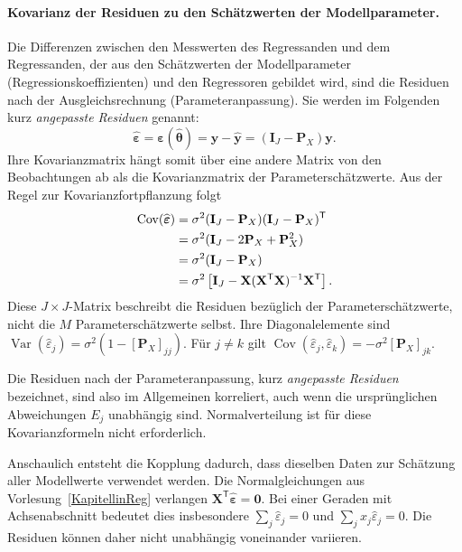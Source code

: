 \paragraph{Kovarianz der Residuen zu den Schätzwerten der Modellparameter.}
Die Differenzen zwischen den Messwerten des Regressanden und dem Regressanden, der aus den Schätzwerten der Modellparameter (Regressionskoeffizienten) und den Regressoren gebildet wird, sind die Residuen nach der Ausgleichsrechnung (Parameteranpassung). Sie werden im Folgenden kurz \textsl{angepasste Residuen} genannt:
\begin{equation}
\widehat{\boldsymbol\varepsilon}
=\boldsymbol\varepsilon(\widehat{\boldsymbol\theta})
=\mathbf y-\widehat{\mathbf y}
=(\mathbf I_J-\mathbf P_X)\mathbf y.
\end{equation}
Ihre Kovarianzmatrix hängt somit über eine andere Matrix von den Beobachtungen ab als die Kovarianzmatrix der Parameterschätzwerte. Aus der Regel zur Kovarianzfortpflanzung folgt
\begin{align}
\operatorname{Cov}(\widehat{\boldsymbol\varepsilon})
&=\sigma^2(\mathbf I_J-\mathbf P_X)
(\mathbf I_J-\mathbf P_X)^\mathsf T\notag\\
&=\sigma^2(\mathbf I_J-2\mathbf P_X+\mathbf P_X^2)\notag\\
&=\sigma^2(\mathbf I_J-\mathbf P_X)\notag\\
&=\sigma^2\left[\mathbf I_J-
\mathbf X(\mathbf X^\mathsf T\mathbf X)^{-1}\mathbf X^\mathsf T\right].
\label{KonzepteResiduenkovarianz}
\end{align}
Diese $J\times J$-Matrix beschreibt die Residuen bezüglich der Parameterschätzwerte, nicht die
$M$ Parameterschätzwerte selbst. Ihre Diagonalelemente sind
$\operatorname{Var}(\widehat\varepsilon_j)
=\sigma^2(1-[\mathbf P_X]_{jj})$.
Für $j\ne k$ gilt
$\operatorname{Cov}(\widehat\varepsilon_j,\widehat\varepsilon_k)
=-\sigma^2[\mathbf P_X]_{jk}$.

Die Residuen nach der Parameteranpassung, kurz \textsl{angepasste Residuen} bezeichnet, sind also im Allgemeinen korreliert, auch wenn die ursprünglichen Abweichungen $E_j$ unabhängig sind.
Normalverteilung ist für diese Kovarianzformeln nicht erforderlich.

Anschaulich entsteht die Kopplung dadurch, dass dieselben Daten zur
Schätzung aller Modellwerte verwendet werden. Die Normalgleichungen
aus Vorlesung~\ref{KapitellinReg} verlangen
$\mathbf X^\mathsf T\widehat{\boldsymbol\varepsilon}=\mathbf0$.
Bei einer Geraden mit Achsenabschnitt bedeutet dies insbesondere
$\sum_j\widehat\varepsilon_j=0$ und
$\sum_j x_j\widehat\varepsilon_j=0$.
Die Residuen können daher nicht unabhängig voneinander variieren.

